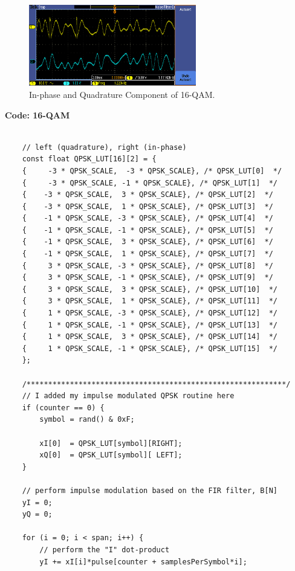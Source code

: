 \documentclass{article}
\begin{document}
\begin{figure}[h]
  \begin{center}
    \includegraphics[width=0.65\textwidth]{img/task_d_oscilloscope.png}
    \caption{In-phase and Quadrature Component of 16-QAM.}
  \end{center}
\end{figure}
\textbf{Code: 16-QAM}

\begin{verbatim}

	// left (quadrature), right (in-phase)
	const float QPSK_LUT[16][2] = {
	{     -3 * QPSK_SCALE,  -3 * QPSK_SCALE}, /* QPSK_LUT[0]  */
	{     -3 * QPSK_SCALE, -1 * QPSK_SCALE}, /* QPSK_LUT[1]  */
	{    -3 * QPSK_SCALE,  3 * QPSK_SCALE}, /* QPSK_LUT[2]  */
	{    -3 * QPSK_SCALE,  1 * QPSK_SCALE}, /* QPSK_LUT[3]  */
	{    -1 * QPSK_SCALE, -3 * QPSK_SCALE}, /* QPSK_LUT[4]  */
	{    -1 * QPSK_SCALE, -1 * QPSK_SCALE}, /* QPSK_LUT[5]  */
	{    -1 * QPSK_SCALE,  3 * QPSK_SCALE}, /* QPSK_LUT[6]  */
	{    -1 * QPSK_SCALE,  1 * QPSK_SCALE}, /* QPSK_LUT[7]  */
	{     3 * QPSK_SCALE, -3 * QPSK_SCALE}, /* QPSK_LUT[8]  */
	{     3 * QPSK_SCALE, -1 * QPSK_SCALE}, /* QPSK_LUT[9]  */
	{     3 * QPSK_SCALE,  3 * QPSK_SCALE}, /* QPSK_LUT[10]  */
	{     3 * QPSK_SCALE,  1 * QPSK_SCALE}, /* QPSK_LUT[11]  */
	{     1 * QPSK_SCALE, -3 * QPSK_SCALE}, /* QPSK_LUT[12]  */
	{     1 * QPSK_SCALE, -1 * QPSK_SCALE}, /* QPSK_LUT[13]  */
	{     1 * QPSK_SCALE,  3 * QPSK_SCALE}, /* QPSK_LUT[14]  */
	{     1 * QPSK_SCALE, -1 * QPSK_SCALE}, /* QPSK_LUT[15]  */
	};

	/************************************************************/
	// I added my impulse modulated QPSK routine here
	if (counter == 0) {
		symbol = rand() & 0xF;

		xI[0]  = QPSK_LUT[symbol][RIGHT];  
		xQ[0]  = QPSK_LUT[symbol][ LEFT];   
	}

	// perform impulse modulation based on the FIR filter, B[N]
	yI = 0;
	yQ = 0;

	for (i = 0; i < span; i++) {
		// perform the "I" dot-product
		yI += xI[i]*pulse[counter + samplesPerSymbol*i];	


\end{verbatim}
\end{document}
